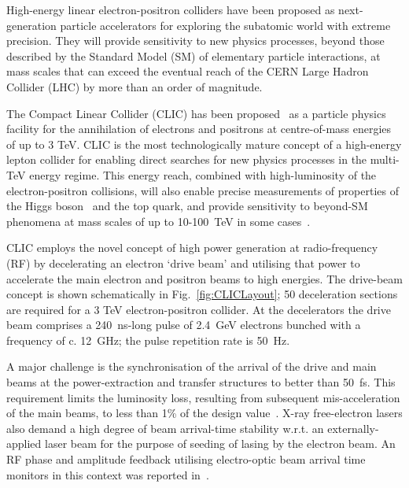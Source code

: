 \documentclass[%
 reprint,
 superscriptaddress,
 amsmath,
 amssymb,
 prl,
]{revtex4-1}
\begin{document}

High-energy linear electron-positron colliders have been proposed as 
next-generation particle accelerators for exploring the subatomic world with 
extreme precision. They will provide sensitivity to new physics processes, 
beyond those described by the Standard Model (SM) of elementary particle 
interactions, at mass scales that can exceed the eventual reach of the CERN 
Large Hadron Collider (LHC) by more than an order of magnitude. 

The Compact Linear Collider (CLIC) has been proposed~\cite{CLICCDR} as a 
particle physics facility for the annihilation of electrons and positrons at 
centre-of-mass energies of up to 3 TeV. CLIC is the most technologically mature 
concept of a high-energy lepton collider for enabling direct searches for new 
physics processes in the multi-TeV energy regime. This energy reach, combined 
with high-luminosity of the electron-positron collisions, will also enable 
precise measurements of properties of the Higgs boson~\cite{CLIC-Higgs} and the 
top quark, and provide sensitivity to beyond-SM phenomena at mass scales of up 
to 10-100~TeV in some cases~\cite{CLIC-staging}.

CLIC employs the novel concept of high power generation at 
radio-frequency (RF) by decelerating an electron ‘drive beam’ and utilising 
that power to accelerate the main electron and positron beams to 
high energies. The drive-beam concept is shown schematically in 
Fig.~\ref{fig:CLICLayout}; 50 deceleration sections are required for a 3 TeV 
electron-positron collider. At the decelerators the drive beam comprises a 
240~ns-long pulse of 2.4~GeV electrons bunched with a frequency of c. 12~GHz; 
the pulse repetition rate is 50~Hz.

A major challenge is the synchronisation of the arrival of the drive and main 
beams at the power-extraction and transfer structures to better than 50~fs. 
This requirement limits the luminosity loss, resulting from subsequent 
mis-acceleration of the main beams, to less than 1\% of the design 
value~\cite{Gerber2015}. X-ray free-electron lasers also demand a high degree 
of beam arrival-time stability w.r.t. an externally-applied laser beam for the 
purpose of seeding of lasing by the electron beam. An RF phase and amplitude 
feedback utilising electro-optic beam arrival time monitors in this context was 
reported in~\cite{flashPRL}.
\end{document}
